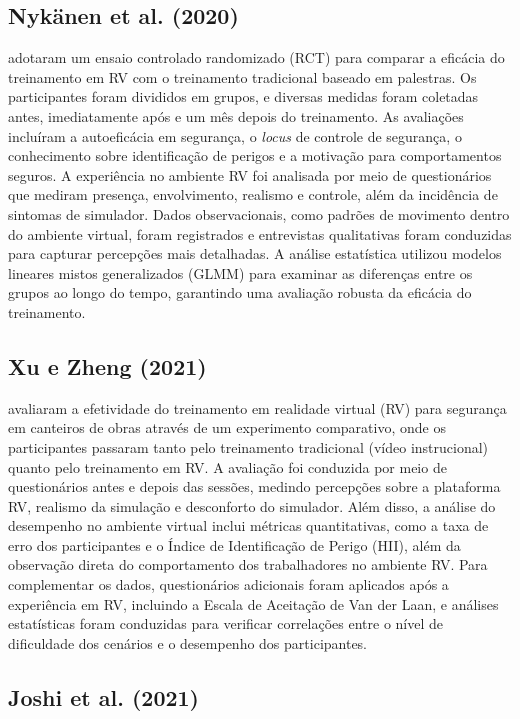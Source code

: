 \subsection{Nykänen et al. (2020)}

 adotaram um ensaio controlado randomizado (\gls{RCT}) para comparar a eficácia do treinamento em RV com o treinamento tradicional baseado em palestras. Os participantes foram divididos em grupos, e diversas medidas foram coletadas antes, imediatamente após e um mês depois do treinamento. As avaliações incluíram a autoeficácia em segurança, o \textit{locus} de controle de segurança, o conhecimento sobre identificação de perigos e a motivação para comportamentos seguros. A experiência no ambiente RV foi analisada por meio de questionários que mediram presença, envolvimento, realismo e controle, além da incidência de sintomas de simulador. Dados observacionais, como padrões de movimento dentro do ambiente virtual, foram registrados e entrevistas qualitativas foram conduzidas para capturar percepções mais detalhadas. A análise estatística utilizou modelos lineares mistos generalizados (\gls{GLMM}) para examinar as diferenças entre os grupos ao longo do tempo, garantindo uma avaliação robusta da eficácia do treinamento.

\subsection{Xu e Zheng (2021)}

 avaliaram a efetividade do treinamento em realidade virtual (RV) para segurança em canteiros de obras através de um experimento comparativo, onde os participantes passaram tanto pelo treinamento tradicional (vídeo instrucional) quanto pelo treinamento em RV. A avaliação foi conduzida por meio de questionários antes e depois das sessões, medindo percepções sobre a plataforma RV, realismo da simulação e desconforto do simulador. Além disso, a análise do desempenho no ambiente virtual inclui métricas quantitativas, como a taxa de erro dos participantes e o Índice de Identificação de Perigo (\gls{HII}), além da observação direta do comportamento dos trabalhadores no ambiente RV. Para complementar os dados, questionários adicionais foram aplicados após a experiência em RV, incluindo a Escala de Aceitação de Van der Laan, e análises estatísticas foram conduzidas para verificar correlações entre o nível de dificuldade dos cenários e o desempenho dos participantes.

\subsection{Joshi et al. (2021)}

